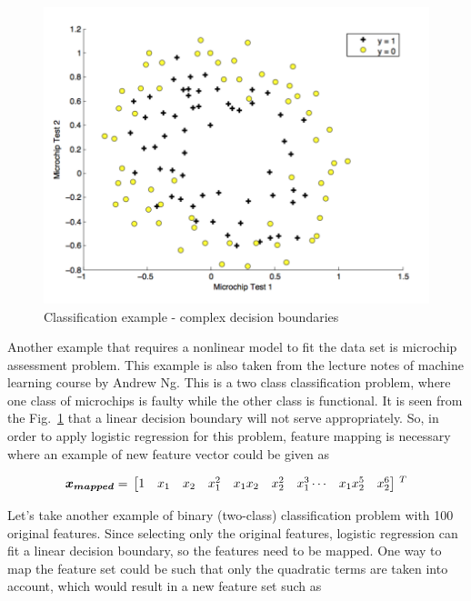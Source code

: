\begin{figure}
\begin{center}
\includegraphics[width=13cm]{figures/classificationMicrochip}    %
\caption{Classification example - complex decision boundaries \cite{andrewNg_MachLearning}} 
\label{fig:classificationEx3}
\end{center}
\end{figure}

Another example that requires a nonlinear model to fit the data set is microchip assessment problem.
This example is also taken from the lecture notes of machine learning course by Andrew Ng. 
This is a two class classification problem, where one class of microchips is faulty while the other class is functional.
It is seen from the Fig.~\ref{fig:classificationEx3} that a linear decision boundary will not serve appropriately. 
So, in order to apply logistic regression for this problem, feature mapping is necessary where an example of new feature vector could be given as

\begin{equation}{\label{eqn:featureMapping2}}
\bm{x_{mapped}}
=\,
\begin{bmatrix}
1 & x_1 & x_2 & x_1^2 & x_1x_2 & x_2^2 & x_1^3 \cdots & x_1x_2^5 & x_2^6 
\end{bmatrix}
\,^ T
\end{equation} 

Let's take another example of binary (two-class) classification problem with 100 original features.
Since selecting only the original features, logistic regression can fit a linear decision boundary, so the features need to be mapped.
One way to map the feature set could be such that only the quadratic terms are taken into account, which would result in a new feature set such as
 
